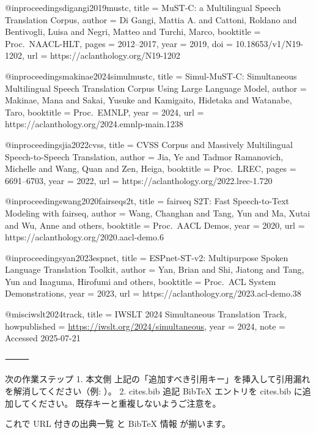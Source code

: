 @inproceedings{digangi2019mustc,
  title     = {{M}u{ST}-{C}: a Multilingual Speech Translation Corpus},
  author    = {Di Gangi, Mattia A. and Cattoni, Roldano and Bentivogli, Luisa and Negri, Matteo and Turchi, Marco},
  booktitle = {Proc.\ NAACL-HLT},
  pages     = {2012--2017},
  year      = {2019},
  doi       = {10.18653/v1/N19-1202},
  url       = {https://aclanthology.org/N19-1202}
}

@inproceedings{makinae2024simulmustc,
  title     = {Simul-{M}u{ST}-{C}: Simultaneous Multilingual Speech Translation Corpus Using Large Language Model},
  author    = {Makinae, Mana and Sakai, Yusuke and Kamigaito, Hidetaka and Watanabe, Taro},
  booktitle = {Proc.\ EMNLP},
  year      = {2024},
  url       = {https://aclanthology.org/2024.emnlp-main.1238}
}

@inproceedings{jia2022cvss,
  title     = {CVSS Corpus and Massively Multilingual Speech-to-Speech Translation},
  author    = {Jia, Ye and Tadmor Ramanovich, Michelle and Wang, Quan and Zen, Heiga},
  booktitle = {Proc.\ LREC},
  pages     = {6691--6703},
  year      = {2022},
  url       = {https://aclanthology.org/2022.lrec-1.720}
}

@inproceedings{wang2020fairseqs2t,
  title     = {fairseq S2T: Fast Speech-to-Text Modeling with fairseq},
  author    = {Wang, Changhan and Tang, Yun and Ma, Xutai and Wu, Anne and others},
  booktitle = {Proc.\ AACL Demos},
  year      = {2020},
  url       = {https://aclanthology.org/2020.aacl-demo.6}
}

@inproceedings{yan2023espnet,
  title     = {ESPnet-ST-v2: Multipurpose Spoken Language Translation Toolkit},
  author    = {Yan, Brian and Shi, Jiatong and Tang, Yun and Inaguma, Hirofumi and others},
  booktitle = {Proc.\ ACL System Demonstrations},
  year      = {2023},
  url       = {https://aclanthology.org/2023.acl-demo.38}
}

@misc{iwslt2024track,
  title        = {IWSLT 2024 Simultaneous Translation Track},
  howpublished = {\url{https://iwslt.org/2024/simultaneous}},
  year         = {2024},
  note         = {Accessed 2025-07-21}
}

⸻

次の作業ステップ
	1.	本文側
上記の「追加すべき引用キー」を挿入して引用漏れを解消してください（例: \cite{ma2023efficient}）。
	2.	cites.bib 追記
BibTeX エントリを cites.bib に追加してください。
既存キーと重複しないようご注意を。

これで URL 付きの出典一覧 と BibTeX 情報 が揃います。
